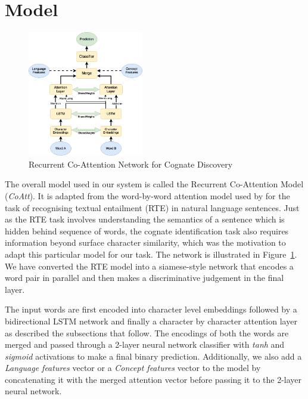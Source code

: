 \documentclass[11pt,letterpaper]{article}
\begin{document}
\section{Model}

\begin{figure}[t]
	\centering
	\includegraphics[width=0.45\textwidth]{CoAttNetwork}
    \caption{Recurrent Co-Attention Network for Cognate Discovery}
    \label{CoAttNet}
\end{figure}

The overall model used in our system is called the Recurrent Co-Attention Model (\textit{CoAtt}). It is adapted from the word-by-word attention model used by \cite{rocktaschel2016reasoning} for the task of recognising textual entailment (RTE) in natural language sentences. Just as the RTE task involves understanding the semantics of a sentence which is hidden behind sequence of words, the cognate identification task also requires information beyond surface character similarity, which was the motivation to adapt this particular model for our task. The network is illustrated in Figure~\ref{CoAttNet}. We have converted the RTE model into a siamese-style network that encodes a word pair in parallel and then makes a discriminative judgement in the final layer. 

The input words are first encoded into character level embeddings followed by a bidirectional LSTM network and finally a character by character attention layer as described the subsections that follow. The encodings of both the words are merged and passed through a 2-layer neural network classifier with \textit{tanh} and \textit{sigmoid} activations to make a final binary prediction. Additionally, we also add a \textit{Language features} vector or a \textit{Concept features} vector to the model by concatenating it with the merged attention vector before passing it to the 2-layer neural network.
\end{document}
